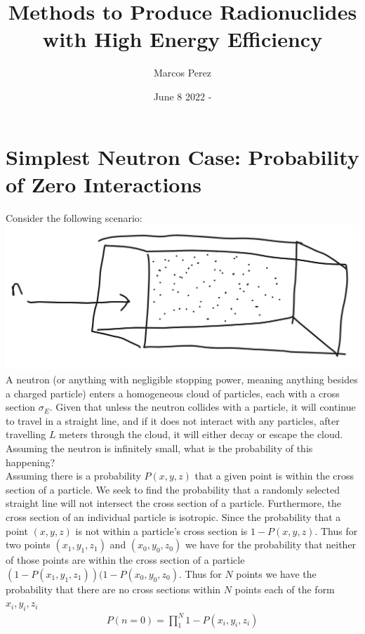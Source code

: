 \documentclass[12pt]{article}
\title{Methods to Produce Radionuclides with High Energy Efficiency}
\author{Marcos Perez}
\date{June 8 2022 - }
\begin{document}
\maketitle
\section{Simplest Neutron Case: Probability of Zero Interactions}
Consider the following scenario:
\includegraphics[scale=.4]{Images/simplestCaseNeutron.PNG}\\
A neutron (or anything with negligible stopping power, meaning anything besides a charged particle) enters a homogeneous cloud of particles, each with a cross section $\sigma_E$. Given that unless the neutron collides with a particle, it will continue to travel in a straight line, and if it does not interact with any particles, after travelling $L$ meters through the cloud, it will either decay or escape the cloud. Assuming the neutron is infinitely small, what is the probability of this happening? \\
Assuming there is a probability $P(x,y,z)$ that a given point is within the cross section of a particle. We seek to find the probability that a randomly selected straight line will not intersect the cross section of a particle. Furthermore, the cross section of an individual particle is isotropic. Since the probability that a point $(x,y,z)$ is not within a particle's cross section is $1-P(x,y,z)$. Thus for two points $(x_1,y_1,z_1)$ and $(x_0,y_0,z_0)$ we have for the probability that neither of those points are within the cross section of a particle $(1-P(x_1,y_1,z_1))(1-P(x_0,y_0,z_0)$. Thus for $N$ points we have the probability that there are no cross sections within $N$ points each of the form $x_i,y_i,z_i$
\begin{equation}
\begin{split}
P(n=0) = \prod_{1}^{N} 1-P(x_i,y_i,z_i)
\end{split}
\end{equation}
\end{document}
